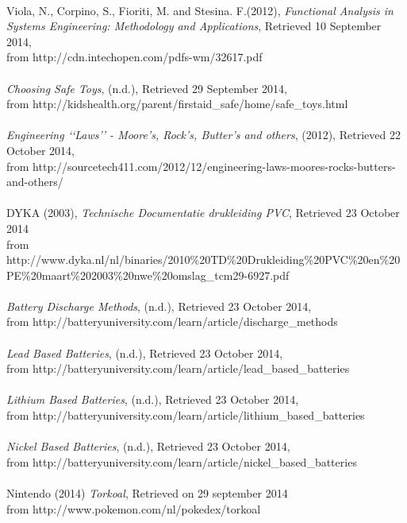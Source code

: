 \documentclass[11pt,twoside,a4paper]{report}
\begin{document}
\\
Viola, N., Corpino, S., Fioriti, M. and Stesina. F.(2012), \textit{Functional Analysis in Systems Engineering: Methodology and Applications}, Retrieved 10 September 2014, \\from http://cdn.intechopen.com/pdfs-wm/32617.pdf \\
\\
\textit{Choosing Safe Toys}, (n.d.), Retrieved 29 September 2014, \\from http://kidshealth.org/parent/firstaid\_safe/home/safe\_toys.html \\
\\
\textit{Engineering \lq\lq{}Laws\rq\rq{} - Moore\rq{}s, Rock\rq{}s, Butter\rq{}s and others}, (2012), Retrieved 22 October 2014, \\from http://sourcetech411.com/2012/12/engineering-laws-moores-rocks-butters-and-others/ \\
\\
DYKA (2003), \textit{Technische Documentatie drukleiding PVC}, Retrieved 23 October 2014 \\
from http://www.dyka.nl/nl/binaries/2010\%20TD\%20Drukleiding\%20PVC\%20en\%20PE\%20maart\%202003\%20nwe\%20omslag\_tcm29-6927.pdf \\
\\
\textit{Battery Discharge Methods}, (n.d.), Retrieved 23 October 2014, \\from http://batteryuniversity.com/learn/article/discharge\_methods\\
\\
\textit{Lead Based Batteries}, (n.d.), Retrieved 23 October 2014, \\from http://batteryuniversity.com/learn/article/lead\_based\_batteries \\
\\
\textit{Lithium Based Batteries}, (n.d.), Retrieved 23 October 2014, \\from http://batteryuniversity.com/learn/article/lithium\_based\_batteries \\
\\
\textit{Nickel Based Batteries}, (n.d.), Retrieved 23 October 2014, \\from 
http://batteryuniversity.com/learn/article/nickel\_based\_batteries \\
\\
Nintendo (2014) \textit{Torkoal}, Retrieved on 29 september 2014\\ from http://www.pokemon.com/nl/pokedex/torkoal \\
\end{document}
